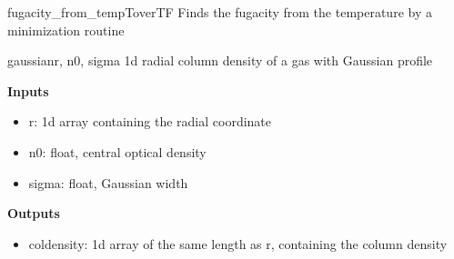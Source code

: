 \documentclass[letterpaper,10pt,english]{manual}
\begin{document}
\hypertarget{odysseus.fitfuncs.fugacity_from_temp}{}\begin{funcdesc}{fugacity\_from\_temp}{ToverTF}
Finds the fugacity from the temperature by a minimization routine
\end{funcdesc}

\hypertarget{odysseus.fitfuncs.gaussian}{}\begin{funcdesc}{gaussian}{r, n0, sigma}
1d radial column density of a gas with Gaussian profile

\textbf{Inputs}
\begin{itemize}
\item {} 
r: 1d array containing the radial coordinate

\item {} 
n0: float, central optical density

\item {} 
sigma: float, Gaussian width

\end{itemize}

\textbf{Outputs}
\begin{itemize}
\item {} 
coldensity: 1d array of the same length as r, containing the column density

\end{itemize}
\end{funcdesc}
\end{document}
